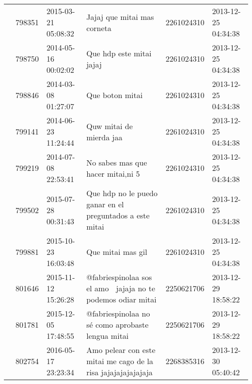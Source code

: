 \begin{tabular}{llllrl}
           & 798351  & 2015-03-21 05:08:32 &                                                                                                                  Jajaj que mitai mas corneta &  2261024310 & 2013-12-25 04:34:38 \\
           & 798750  & 2014-05-16 00:02:02 &                                                                                                                     Que hdp este mitai jajaj &  2261024310 & 2013-12-25 04:34:38 \\
           & 798846  & 2014-03-08 01:27:07 &                                                                                                                              Que boton mitai &  2261024310 & 2013-12-25 04:34:38 \\
           & 799141  & 2014-06-23 11:24:44 &                                                                                                                      Quw mitai de mierda jaa &  2261024310 & 2013-12-25 04:34:38 \\
           & 799219  & 2014-07-08 22:53:41 &                                                                                                            No sabes mas que hacer mitai,ni 5 &  2261024310 & 2013-12-25 04:34:38 \\
           & 799502  & 2015-07-28 00:31:43 &                                                                                     Que hdp no le puedo ganar en el preguntados a este mitai &  2261024310 & 2013-12-25 04:34:38 \\
           & 799881  & 2015-10-23 16:03:48 &                                                                                                                            Que mitai mas gil &  2261024310 & 2013-12-25 04:34:38 \\
           & 801646  & 2015-11-12 15:26:28 &                                                                              @fabriespinolaa sos 👑 el amo 👑 jajaja no te podemos odiar mitai &  2250621706 & 2013-12-29 18:58:22 \\
           & 801781  & 2015-12-05 17:48:55 &                                                                                            @fabriespinolaa no sé como aprobaste lengua mitai &  2250621706 & 2013-12-29 18:58:22 \\
           & 802754  & 2016-05-17 23:23:34 &                                                                                Amo pelear con este mitai me cago de la risa jajajajajajajaja &  2268385316 & 2013-12-30 05:40:42 \\

\end{tabular}
